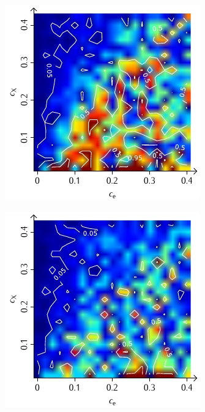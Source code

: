 \documentclass[a4paper, 10pt, twoside, openany]{book} %
\begin{document}
\begin{figure}
\begin{minipage}[t]{0.48\textwidth}
        \includegraphics[width=\textwidth]{Abbildungen/Phasendiagramme/Konturen/F_penalty_cluster_P.pdf}
        \label{F_penalty_cluster_P}
    \end{minipage}
    \begin{minipage}[t]{0.48\textwidth}
        \includegraphics[width=\textwidth]{Abbildungen/Phasendiagramme/Konturen/F_random_P.pdf}

\end{minipage}
\end{figure}
\end{document}
